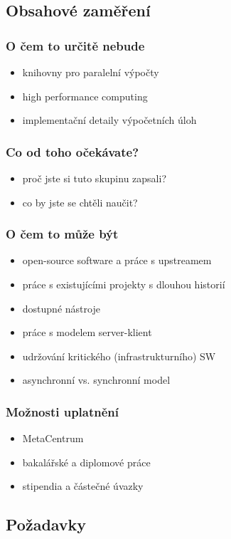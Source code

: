 \subsection{Obsahové zaměření}

\begin{frame}
	\frametitle{O čem to určitě nebude}
	\begin{itemize}
		\item{knihovny pro paralelní výpočty}
		\item{high performance computing}
		\item{implementační detaily výpočetních úloh}
	\end{itemize}
\end{frame}

\begin{frame}
	\frametitle{Co od toho očekávate?}
	\begin{itemize}
		\item{proč jste si tuto skupinu zapsali?}
		\item{co by jste se chtěli naučit?}
	\end{itemize}
\end{frame}

\begin{frame}
	\frametitle{O čem to může být}
	\begin{itemize}
		\item{open-source software a práce s upstreamem}
		\item{práce s existujícími projekty s dlouhou historií}
		\item{dostupné nástroje}
		\item{práce s modelem server-klient}
		\item{udržování kritického (infrastrukturního) SW}
		\item{asynchronní vs. synchronní model}
	\end{itemize}
\end{frame}

\begin{frame}
	\frametitle{Možnosti uplatnění}
	\begin{itemize}
		\item{MetaCentrum}
		\item{bakalářské a diplomové práce}
		\item{stipendia a částečné úvazky}
	\end{itemize}
\end{frame}

\subsection{Požadavky}

